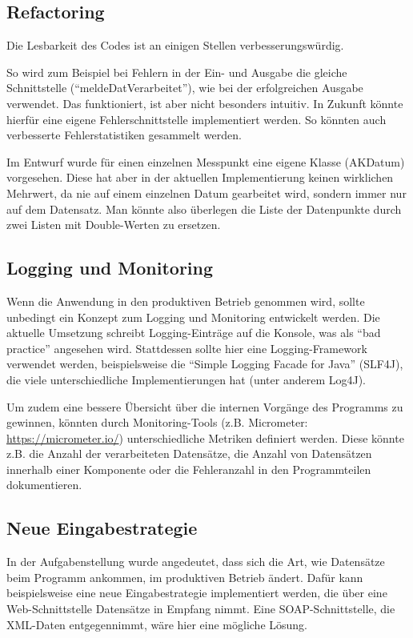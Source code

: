 \subsection{Refactoring}\label{subsec:refactoring}
Die Lesbarkeit des Codes ist an einigen Stellen verbesserungswürdig.

So wird zum Beispiel bei Fehlern in der Ein- und Ausgabe die gleiche Schnittstelle (\enquote{meldeDatVerarbeitet}), wie bei der erfolgreichen Ausgabe verwendet.
Das funktioniert, ist aber nicht besonders intuitiv.
In Zukunft könnte hierfür eine eigene Fehlerschnittstelle implementiert werden.
So könnten auch verbesserte Fehlerstatistiken gesammelt werden.

Im Entwurf wurde für einen einzelnen Messpunkt eine eigene Klasse (AKDatum) vorgesehen.
Diese hat aber in der aktuellen Implementierung keinen wirklichen Mehrwert, da nie auf einem einzelnen Datum gearbeitet wird, sondern immer nur auf dem Datensatz.
Man könnte also überlegen die Liste der Datenpunkte durch zwei Listen mit Double-Werten zu ersetzen.

\subsection{Logging und Monitoring}\label{subsec:log-moni}
Wenn die Anwendung in den produktiven Betrieb genommen wird, sollte unbedingt ein Konzept zum Logging und Monitoring entwickelt werden.
Die aktuelle Umsetzung schreibt Logging-Einträge auf die Konsole, was als \enquote{bad practice} angesehen wird.
Stattdessen sollte hier eine Logging-Framework verwendet werden, beispielsweise die \enquote{Simple Logging Facade for Java} (SLF4J), die viele unterschiedliche Implementierungen hat (unter anderem Log4J).

Um zudem eine bessere Übersicht über die internen Vorgänge des Programms zu gewinnen, könnten durch Monitoring-Tools (z.B. Micrometer: \url{https://micrometer.io/}) unterschiedliche Metriken definiert werden.
Diese könnte z.B. die Anzahl der verarbeiteten Datensätze, die Anzahl von Datensätzen innerhalb einer Komponente oder die Fehleranzahl in den Programmteilen dokumentieren.

\subsection{Neue Eingabestrategie}\label{subsec:eingabestrat}
In der Aufgabenstellung wurde angedeutet, dass sich die Art, wie Datensätze beim Programm ankommen, im produktiven Betrieb ändert.
Dafür kann beispielsweise eine neue Eingabestrategie implementiert werden, die über eine Web-Schnittstelle Datensätze in Empfang nimmt.
Eine SOAP-Schnittstelle, die XML-Daten entgegennimmt, wäre hier eine mögliche Lösung.
